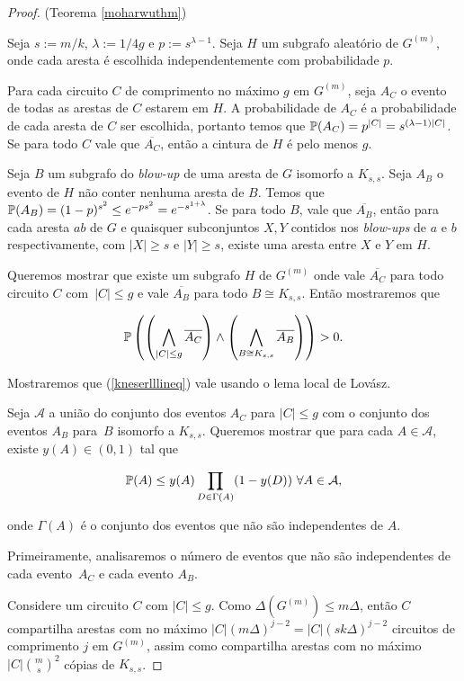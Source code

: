\begin{proof}{(Teorema \ref{moharwuthm})}

Seja $s := m/k$, $\lambda := 1/4g$ e $p := s^{\lambda-1}$. Seja $H$ um subgrafo aleatório de $G^{(m)}$, onde cada aresta é escolhida independentemente com probabilidade $p$.

Para cada circuito $C$ de comprimento no máximo $g$ em $G^{(m)}$, seja $A_C$ o evento de todas as arestas de $C$ estarem em $H$. A probabilidade de $A_C$ é a probabilidade de cada aresta de $C$ ser escolhida, portanto temos que $\mathbb{P}(A_C) = p^{|C|} = s^{(\lambda-1)|C|}$. Se para todo $C$ vale que $\overline{A_C}$, então a cintura de $H$ é pelo menos $g$.

Seja $B$ um subgrafo do \textit{blow-up} de uma aresta de $G$ isomorfo a $K_{s,s}$. Seja $A_B$ o evento de $H$ não conter nenhuma aresta de $B$. Temos que $\mathbb{P}(A_B) = (1-p)^{s^2} \leq e^{-ps^2} = e^{-s^{1+\lambda}}$. Se para todo $B$, vale que $\overline{A_B}$, então para cada aresta $ab$ de $G$ e quaisquer subconjuntos $X,Y$ contidos nos \textit{blow-ups} de $a$ e $b$ respectivamente, com $|X| \geq s$ e $|Y| \geq s$, existe uma aresta entre $X$ e $Y$ em $H$.

Queremos mostrar que existe um subgrafo $H$ de $G^{(m)}$ onde vale $\overline{A_C}$ para todo circuito $C$ com~$|C| \leq g$ e vale $\overline{A_B}$ para todo $B \cong K_{s,s}$. Então mostraremos que

\begin{equation}\label{kneserlllineq}
\mathbb{P}\left(\left(\bigwedge\limits_{|C|\leq g}\overline{A_C}\right)\wedge\left(\bigwedge\limits_{B\cong K_{s,s}}\overline{A_B}\right)\right) > 0.
\end{equation}

Mostraremos que (\ref{kneserlllineq}) vale usando o lema local de Lovász.

Seja $\mathcal{A}$ a união do conjunto dos eventos $A_C$ para $|C| \leq g$ com o conjunto dos eventos $A_B$ para~$B$ isomorfo a $K_{s,s}$. Queremos mostrar que para cada $A\in\mathcal{A}$, existe $y(A) \in (0,1)$ tal que

\[\mathbb{P}(A)\leq y(A) \prod_{D\in \Gamma(A)}(1-y(D))\ \forall A\in\mathcal{A},\]

onde $\Gamma(A)$ é o conjunto dos eventos que não são independentes de $A$.

Primeiramente, analisaremos o número de eventos que não são independentes de cada evento~$A_C$ e cada evento $A_B$.

Considere um circuito $C$ com $|C| \leq g$. Como $\Delta(G^{(m)}) \leq m\Delta$, então $C$ compartilha arestas com no máximo $|C|(m\Delta)^{j-2} = |C|(sk\Delta)^{j-2}$ circuitos de comprimento $j$ em $G^{(m)}$, assim como compartilha arestas com no máximo $|C|\binom{m}{s}^2$ cópias de $K_{s,s}$.


\end{proof}
